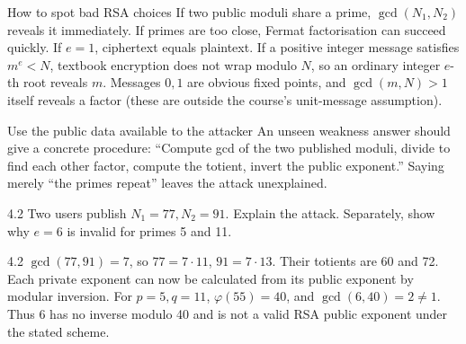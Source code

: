 \documentclass[11pt,a4paper]{article}
\begin{document}
\begin{concept}{How to spot bad RSA choices}
If two public moduli share a prime, \(\gcd(N_1,N_2)\) reveals it immediately. If primes are too close, Fermat factorisation can succeed quickly. If \(e=1\), ciphertext equals plaintext. If a positive integer message satisfies \(m^e<N\), textbook encryption does not wrap modulo \(N\), so an ordinary integer \(e\)-th root reveals \(m\). Messages \(0,1\) are obvious fixed points, and \(\gcd(m,N)>1\) itself reveals a factor (these are outside the course's unit-message assumption).
\end{concept}
\begin{tip}{Use the public data available to the attacker}
An unseen weakness answer should give a concrete procedure: ``Compute gcd of the two published moduli, divide to find each other factor, compute the totient, invert the public exponent.'' Saying merely ``the primes repeat'' leaves the attack unexplained.
\end{tip}
\begin{question}{4.2}
Two users publish \(N_1=77,N_2=91\). Explain the attack. Separately, show why \(e=6\) is invalid for primes 5 and 11.
\end{question}
\begin{answer}{4.2}
\(\gcd(77,91)=7\), so \(77=7\cdot11\), \(91=7\cdot13\). Their totients are 60 and 72. Each private exponent can now be calculated from its public exponent by modular inversion. For \(p=5,q=11\), \(\varphi(55)=40\), and \(\gcd(6,40)=2\ne1\). Thus 6 has no inverse modulo 40 and is not a valid RSA public exponent under the stated scheme.
\end{answer}
\end{document}
